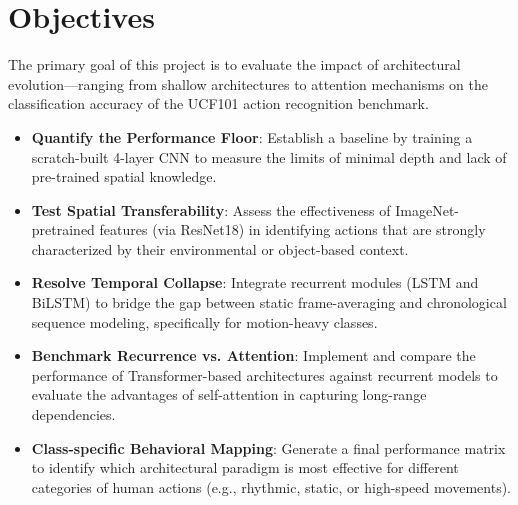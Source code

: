 \section{Objectives}

The primary goal of this project is to evaluate the impact of architectural evolution—ranging from shallow architectures to attention mechanisms on the classification accuracy of the UCF101 action recognition benchmark.

\begin{itemize}
    \item \textbf{Quantify the Performance Floor}: Establish a baseline by training a scratch-built 4-layer CNN to measure the limits of minimal depth and lack of pre-trained spatial knowledge.
    \item \textbf{Test Spatial Transferability}: Assess the effectiveness of ImageNet-pretrained features (via ResNet18) in identifying actions that are strongly characterized by their environmental or object-based context.
    \item \textbf{Resolve Temporal Collapse}: Integrate recurrent modules (LSTM and BiLSTM) to bridge the gap between static frame-averaging and chronological sequence modeling, specifically for motion-heavy classes.
    \item \textbf{Benchmark Recurrence vs. Attention}: Implement and compare the performance of Transformer-based architectures against recurrent models to evaluate the advantages of self-attention in capturing long-range dependencies.
    \item \textbf{Class-specific Behavioral Mapping}: Generate a final performance matrix to identify which architectural paradigm is most effective for different categories of human actions (e.g., rhythmic, static, or high-speed movements).
\end{itemize}